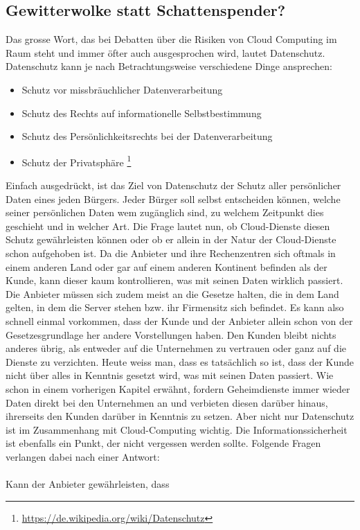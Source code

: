 \subsection{Gewitterwolke statt Schattenspender?}
Das grosse Wort, das bei Debatten über die Risiken von Cloud Computing im Raum steht und immer öfter auch ausgesprochen wird, lautet Datenschutz. Datenschutz kann je nach Betrachtungsweise verschiedene Dinge ansprechen:

\begin{itemize}
\item Schutz vor missbräuchlicher Datenverarbeitung
\item Schutz des Rechts auf informationelle Selbstbestimmung
\item Schutz des Persönlichkeitsrechts bei der Datenverarbeitung
\item Schutz der Privatsphäre
\footnote{\url{https://de.wikipedia.org/wiki/Datenschutz}}
\end{itemize}

Einfach ausgedrückt, ist das Ziel von Datenschutz der Schutz aller persönlicher Daten eines jeden Bürgers. Jeder Bürger soll selbst entscheiden können, welche seiner persönlichen Daten wem zugänglich sind, zu welchem Zeitpunkt dies geschieht und in welcher Art. Die Frage lautet nun, ob Cloud-Dienste diesen Schutz gewährleisten können oder ob er allein in der Natur der Cloud-Dienste schon aufgehoben ist. Da die Anbieter und ihre Rechenzentren sich oftmals in einem anderen Land oder gar auf einem anderen Kontinent befinden als der Kunde, kann dieser kaum kontrollieren, was mit seinen Daten wirklich passiert. Die Anbieter müssen sich zudem meist an die Gesetze halten, die in dem Land gelten, in dem die Server stehen bzw. ihr Firmensitz sich befindet. Es kann also schnell einmal vorkommen, dass der Kunde und der Anbieter allein schon von der Gesetzesgrundlage her andere Vorstellungen haben. Den Kunden bleibt nichts anderes übrig, als entweder auf die Unternehmen zu vertrauen oder ganz auf die Dienste zu verzichten. Heute weiss man, dass es tatsächlich so ist, dass der Kunde nicht über alles in Kenntnis gesetzt wird, was mit seinen Daten passiert. Wie schon in einem vorherigen Kapitel erwähnt, fordern Geheimdienste immer wieder Daten direkt bei den Unternehmen an und verbieten diesen darüber hinaus, ihrerseits den Kunden darüber in Kenntnis zu setzen. 
Aber nicht nur Datenschutz ist im Zusammenhang mit Cloud-Computing wichtig. Die Informationssicherheit ist ebenfalls ein Punkt, der nicht vergessen werden sollte. Folgende Fragen verlangen dabei nach einer Antwort:
\\
\\
Kann der Anbieter gewährleisten, dass

